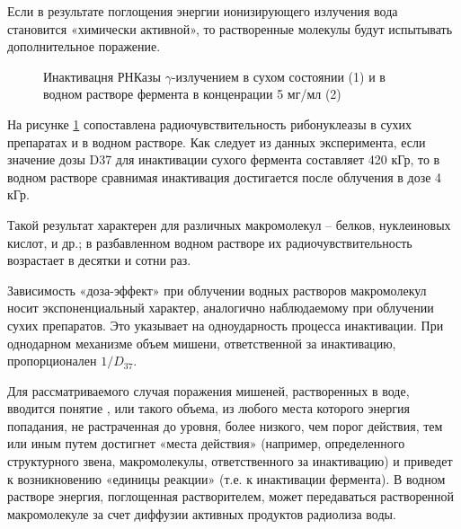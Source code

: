 \documentclass[a4paper, 14pt]{article}
\renewcommand{\emph}[1]{{\color{orange}{\textit{\textbf{#1}}}}}
\begin{document}
Если в результате поглощения энергии ионизирующего излучения вода
становится «химически активной», то растворенные молекулы будут испытывать
дополнительное поражение.

\begin{figure}
    \centering
    \caption{Инактивацня РНКазы $\gamma$-излучением  в сухом состоянии (1) и в водном растворе фермента в конценрации 5 мг/мл (2)}
    \label{inactivationOfWetAndDryRNA}
\end{figure}
На рисунке \ref{inactivationOfWetAndDryRNA} сопоставлена радиочувствительность рибонуклеазы в сухих препаратах и в водном растворе. Как следует из данных эксперимента, если значение дозы D37 для инактивации сухого фермента составляет 420 кГр, то в водном растворе сравнимая инактивация достигается после облучения в дозе 4 кГр. 

Такой результат характерен для различных макромолекул – белков, нуклеиновых кислот, и др.; в разбавленном водном растворе их радиочувствительность возрастает в десятки и сотни раз.

Зависимость «доза-эффект» при облучении водных растворов макромолекул
носит экспоненциальный характер, аналогично наблюдаемому при облучении сухих
препаратов. Это указывает на одноударность процесса инактивации. При однодарном
механизме объем мишени, ответственной за инактивацию, пропорционален $1/D_{37}$.

Для рассматриваемого случая поражения мишеней, растворенных в воде,
вводится понятие \emph{«эффективного объема»}, или такого объема, из любого места
которого энергия попадания, не растраченная до уровня, более низкого, чем порог
действия, тем или иным путем достигнет «места действия» (например, определенного
структурного звена, макромолекулы, ответственного за инактивацию) и приведет к
возникновению «единицы реакции» (т.е. к инактивации фермента). В водном растворе энергия, поглощенная растворителем, может передаваться растворенной
макромолекуле за счет диффузии активных продуктов радиолиза воды.
\end{document}
